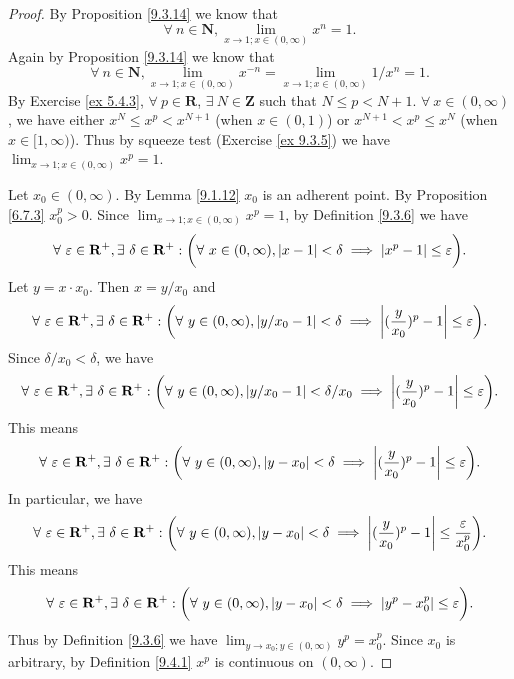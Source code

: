 \begin{proof}
    By Proposition \ref{9.3.14} we know that
    \[
        \forall\ n \in \mathbf{N}, \lim_{x \to 1 ; x \in (0, \infty)} x^n = 1.
    \]
    Again by Proposition \ref{9.3.14} we know that
    \[
        \forall\ n \in \mathbf{N}, \lim_{x \to 1 ; x \in (0, \infty)} x^{-n} = \lim_{x \to 1 ; x \in (0, \infty)} 1 / x^n = 1.
    \]
    By Exercise \ref{ex 5.4.3}, \(\forall\ p \in \mathbf{R}\), \(\exists\ N \in \mathbf{Z}\) such that \(N \leq p < N + 1\).
    \(\forall\ x \in (0, \infty)\), we have either \(x^N \leq x^p < x^{N + 1}\) (when \(x \in (0, 1)\)) or \(x^{N + 1} < x^p \leq x^{N}\) (when \(x \in [1, \infty)\)).
    Thus by squeeze test (Exercise \ref{ex 9.3.5}) we have \(\lim_{x \to 1 ; x \in (0, \infty)} x^p = 1\).

    Let \(x_0 \in (0, \infty)\).
    By Lemma \ref{9.1.12} \(x_0\) is an adherent point.
    By Proposition \ref{6.7.3} \(x_0^p > 0\).
    Since \(\lim_{x \to 1 ; x \in (0, \infty)} x^p = 1\), by Definition \ref{9.3.6} we have
    \[
        \forall\ \varepsilon \in \mathbf{R}^+, \exists\ \delta \in \mathbf{R}^+ : \bigg(\forall\ x \in (0, \infty), \abs*{x - 1} < \delta \implies \abs*{x^p - 1} \leq \varepsilon\bigg).
    \]
    Let \(y = x \cdot x_0\).
    Then \(x = y / x_0\) and
    \[
        \forall\ \varepsilon \in \mathbf{R}^+, \exists\ \delta \in \mathbf{R}^+ : \bigg(\forall\ y \in (0, \infty), \abs*{y / x_0 - 1} < \delta \implies \abs*{(\frac{y}{x_0})^p - 1} \leq \varepsilon\bigg).
    \]
    Since \(\delta / x_0 < \delta\), we have
    \[
        \forall\ \varepsilon \in \mathbf{R}^+, \exists\ \delta \in \mathbf{R}^+ : \bigg(\forall\ y \in (0, \infty), \abs*{y / x_0 - 1} < \delta / x_0 \implies \abs*{(\frac{y}{x_0})^p - 1} \leq \varepsilon\bigg).
    \]
    This means
    \[
        \forall\ \varepsilon \in \mathbf{R}^+, \exists\ \delta \in \mathbf{R}^+ : \bigg(\forall\ y \in (0, \infty), \abs*{y - x_0} < \delta \implies \abs*{(\frac{y}{x_0})^p - 1} \leq \varepsilon\bigg).
    \]
    In particular, we have
    \[
        \forall\ \varepsilon \in \mathbf{R}^+, \exists\ \delta \in \mathbf{R}^+ : \bigg(\forall\ y \in (0, \infty), \abs*{y - x_0} < \delta \implies \abs*{(\frac{y}{x_0})^p - 1} \leq \frac{\varepsilon}{x_0^p}\bigg).
    \]
    This means
    \[
        \forall\ \varepsilon \in \mathbf{R}^+, \exists\ \delta \in \mathbf{R}^+ : \bigg(\forall\ y \in (0, \infty), \abs*{y - x_0} < \delta \implies \abs*{y^p - x_0^p} \leq \varepsilon\bigg).
    \]
    Thus by Definition \ref{9.3.6} we have \(\lim_{y \to x_0 ; y \in (0, \infty)} y^p = x_0^p\).
    Since \(x_0\) is arbitrary, by Definition \ref{9.4.1} \(x^p\) is continuous on \((0, \infty)\).
\end{proof}

\exercisesection

\begin{exercise}\label{ex 9.4.2}

\end{exercise}
